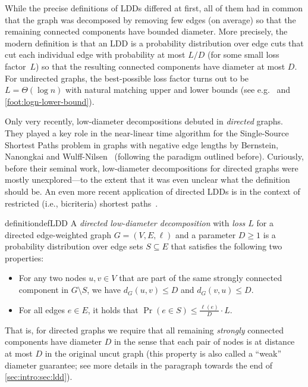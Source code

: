 \documentclass[letterpaper,11pt]{article}
\begin{document}
While the precise definitions of LDDs differed at first, all of them had in common that the graph was decomposed by removing few edges (on average) so that the remaining connected components have bounded diameter. More precisely, the modern definition is that an LDD is a probability distribution over edge cuts that cut each individual edge with probability at most $L/D$ (for some small loss factor~$L$) so that the resulting connected components have diameter at most $D$. For undirected graphs, the best-possible loss factor turns out to be $L = \Theta(\log n)$ with natural matching upper and lower bounds (see e.g.~\cite{Bartal96,FakcharoenpholRT04} and \cref{foot:logn-lower-bound}).

Only very recently, low-diameter decompositions debuted in \emph{directed} graphs. They played a key role in the near-linear time algorithm for the Single-Source Shortest Paths problem in graphs with negative edge lengths by Bernstein, Nanongkai and Wulff-Nilsen~\cite{BernsteinNW22} (following the paradigm outlined before). Curiously, before their seminal work, low-diameter decompositions for directed graphs were mostly unexplored---to the extent that it was even unclear what the definition should be. An even more recent application of directed LDDs is in the context of restricted (i.e., bicriteria) shortest paths~\cite{AshvinkumarBK25}.

\begin{restatable}{definition}{defLDD} \label{def:ldd} 
	A \emph{directed low-diameter decomposition} with \emph{loss $L$} for a directed edge-weighted graph $G = (V, E, \ell)$ and a parameter $D \geq 1$ is a probability distribution over edge sets $S \subseteq E$ that satisfies the following two properties:
	\begin{itemize}
		\item For any two nodes $u, v \in V$ that are part of the same strongly connected component in $G \setminus S$, we have $d_G(u, v) \leq D$ and $d_G(v, u) \leq D$.
		\item For all edges $e \in E$, it holds that $\Pr(e \in S) \leq \frac{\ell(e)}{D} \cdot L$.
	\end{itemize}
\end{restatable}

That is, for directed graphs we require that all remaining \emph{strongly} connected components have diameter $D$ in the sense that each pair of nodes is at distance at most $D$ in the original uncut graph (this property is also called a ``weak'' diameter guarantee; see more details in the paragraph towards the end of \cref{sec:intro:sec:ldd}).
\end{document}
